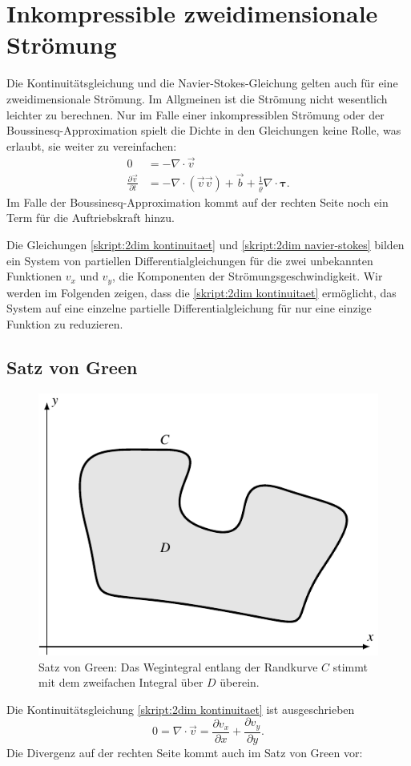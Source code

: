 %
%
%
\section{Inkompressible zweidimensionale Strömung}
Die Kontinuitätsgleichung
und die Navier-Stokes-Gleichung gelten auch für eine zweidimensionale
Strömung.
Im Allgmeinen ist die Strömung nicht wesentlich leichter zu berechnen.
Nur im Falle einer inkompressiblen Strömung oder der Boussinesq-Approximation
spielt die Dichte in den Gleichungen keine Rolle, was erlaubt,
sie weiter zu vereinfachen:
\begin{align}
0
&=
-\nabla\cdot\vec v
\label{skript:2dim kontinuitaet}
\\
\frac{\partial \vec{v}}{\partial t}
&=
-\nabla\cdot(\vec{v}\vec{v})+\vec b + \frac1{\varrho}\nabla\cdot\bm{\tau}.
\label{skript:2dim navier-stokes}
\end{align}
Im Falle der Boussinesq-Approximation kommt auf der rechten Seite noch
ein Term für die Auftriebskraft hinzu.

Die Gleichungen
\eqref{skript:2dim kontinuitaet}
und
\eqref{skript:2dim navier-stokes}
bilden ein System von partiellen Differentialgleichungen für die zwei
unbekannten Funktionen $v_x$ und $v_y$, die Komponenten der 
Strömungsgeschwindigkeit.
Wir werden im Folgenden zeigen, dass die 
\eqref{skript:2dim kontinuitaet}
ermöglicht, das System auf eine einzelne partielle Differentialgleichung
für nur eine einzige Funktion zu reduzieren.

\subsection{Satz von Green}
\begin{figure}
\centering
\includegraphics{chapters/2/green-curve.pdf}
\caption{Satz von Green: Das Wegintegral entlang der Randkurve $C$
stimmt mit dem zweifachen Integral über $D$ überein.
\label{skript:green-kurve}}
\end{figure}
Die Kontinuitätsgleichung 
\eqref{skript:2dim kontinuitaet}
ist ausgeschrieben
\[
0
=
\nabla\cdot\vec v
=
\frac{\partial v_x}{\partial x} + \frac{\partial v_y}{\partial y}.
\]
Die Divergenz auf der rechten Seite kommt auch im Satz von Green
vor:

